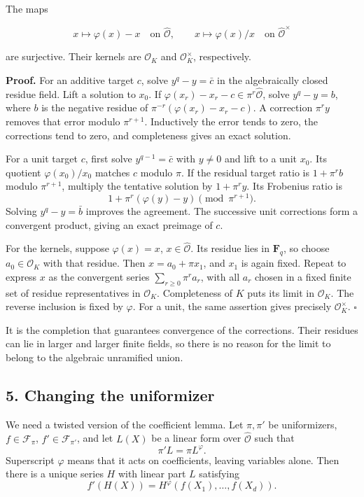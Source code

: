 \documentclass[11pt,a4paper]{article}
\begin{document}
The maps

\[
x\longmapsto\varphi(x)-x
\quad\text{on }\widehat{\mathcal O},\qquad
x\longmapsto\varphi(x)/x
\quad\text{on }\widehat{\mathcal O}^{\times}
\tag{8}
\]

are surjective. Their kernels are \(\mathcal O_K\) and
\(\mathcal O_K^\times\), respectively.

\textbf{Proof.} For an additive target \(c\), solve \(y^q-y=\bar c\) in
the algebraically closed residue field. Lift a solution to \(x_0\). If
\(\varphi(x_r)-x_r-c\in\pi^r\widehat{\mathcal O}\), solve \(y^q-y=b\),
where \(b\) is the negative residue of \(\pi^{-r}(\varphi(x_r)-x_r-c)\).
A correction \(\pi^r y\) removes that error modulo \(\pi^{r+1}\).
Inductively the error tends to zero, the corrections tend to zero, and
completeness gives an exact solution.

For a unit target \(c\), first solve \(y^{q-1}=\bar c\) with \(y\ne0\)
and lift to a unit \(x_0\). Its quotient \(\varphi(x_0)/x_0\) matches
\(c\) modulo \(\pi\). If the residual target ratio is \(1+\pi^r b\)
modulo \(\pi^{r+1}\), multiply the tentative solution by \(1+\pi^r y\).
Its Frobenius ratio is \[
1+\pi^r(\varphi(y)-y)\pmod{\pi^{r+1}}.
\] Solving \(y^q-y=\bar b\) improves the agreement. The successive unit
corrections form a convergent product, giving an exact preimage of
\(c\).

For the kernels, suppose \(\varphi(x)=x\), \(x\in\widehat{\mathcal O}\).
Its residue lies in \(\mathbf F_q\), so choose \(a_0\in\mathcal O_K\)
with that residue. Then \(x=a_0+\pi x_1\), and \(x_1\) is again fixed.
Repeat to express \(x\) as the convergent series
\(\sum_{r\geq0}\pi^r a_r\), with all \(a_r\) chosen in a fixed finite
set of residue representatives in \(\mathcal O_K\). Completeness of
\(K\) puts its limit in \(\mathcal O_K\). The reverse inclusion is fixed
by \(\varphi\). For a unit, the same assertion gives precisely
\(\mathcal O_K^\times\). \(\square\)

It is the completion that guarantees convergence of the corrections.
Their residues can lie in larger and larger finite fields, so there is
no reason for the limit to belong to the algebraic unramified union.

\subsection{5. Changing the uniformizer}\label{changing-the-uniformizer}

We need a twisted version of the coefficient lemma. Let \(\pi,\pi'\) be
uniformizers, \(f\in\mathcal F_\pi\), \(f'\in\mathcal F_{\pi'}\), and
let \(L(X)\) be a linear form over \(\widehat{\mathcal O}\) such that \[
\pi'L=\pi L^\varphi.
\tag{9}
\] Superscript \(\varphi\) means that it acts on coefficients, leaving
variables alone. Then there is a unique series \(H\) with linear part
\(L\) satisfying \[
f'(H(X))=H^\varphi(f(X_1),\ldots,f(X_d)).
\tag{10}
\]
\end{document}
